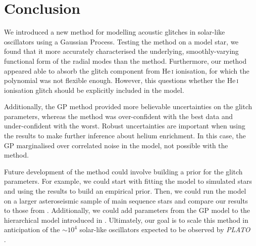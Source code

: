 
\section{Conclusion}

We introduced a new method for modelling acoustic glitches in solar-like oscillators using a Gaussian Process. Testing the method on a model star, we found that it more accurately characterised the underlying, smoothly-varying functional form of the radial modes than the 
 method. Furthermore, our method appeared able to absorb the glitch component from He\,\textsc{i} ionisation, for which the polynomial was not flexible enough. However, this questions whether the He\,\textsc{i} ionisation glitch should be explicitly included in the model.

Additionally, the GP method provided more believable uncertainties on the glitch parameters, whereas the  method was over-confident with the best data and under-confident with the worst. Robust uncertainties are important when using the results to make further inference about helium enrichment. In this case, the GP marginalised over correlated noise in the model, not possible with the  method.

Future development of the method could involve building a prior for the glitch parameters. For example, we could start with fitting the model to simulated stars and using the results to build an empirical prior. Then, we could run the model on a larger asteroseismic sample of main sequence stars \citep[e.g.][]{Lund.SilvaAguirre.ea2017,Davies.SilvaAguirre.ea2016} and compare our results to those from \citet{Verma.Raodeo.ea2019}. Additionally, we could add parameters from the GP model to the hierarchical model introduced in \citet{Lyttle.Davies.ea2021}. Ultimately, our goal is to scale this method in anticipation of the \(\sim 10^4\) solar-like oscillators expected to be observed by \emph{PLATO} \citep{Rauer.Catala.ea2014}.
